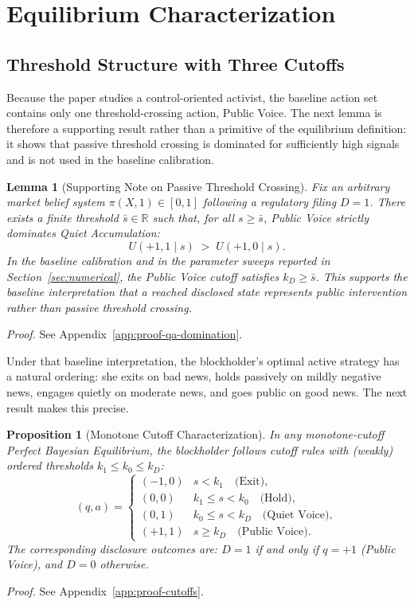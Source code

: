 \documentclass[11pt]{article}
\newtheorem{proposition}{Proposition}
\newtheorem{lemma}{Lemma}
\newcommand{\1}{\mathbf{1}}
\begin{document}
\section{Equilibrium Characterization}
\label{sec:equilibrium}

%
\subsection{Threshold Structure with Three Cutoffs}
%

Because the paper studies a control-oriented activist, the baseline action set contains only one threshold-crossing action, Public Voice. The next lemma is therefore a supporting result rather than a primitive of the equilibrium definition: it shows that passive threshold crossing is dominated for sufficiently high signals and is not used in the baseline calibration.

\begin{lemma}[Supporting Note on Passive Threshold Crossing]
\label{lem:qa-domination}
Fix an arbitrary market belief system $\pi(X,1)\in[0,1]$ following a regulatory filing $D=1$. There exists a finite threshold $\bar{s}\in\mathbb{R}$ such that, for all $s\ge \bar{s}$, Public Voice strictly dominates Quiet Accumulation:
\[
U(+1,1\mid s)\;>\;U(+1,0\mid s).
\]
In the baseline calibration and in the parameter sweeps reported in Section~\ref{sec:numerical}, the Public Voice cutoff satisfies $k_D\ge \bar{s}$. This supports the baseline interpretation that a reached disclosed state represents public intervention rather than passive threshold crossing.
\end{lemma}
\textit{Proof.} See Appendix~\ref{app:proof-qa-domination}.

Under that baseline interpretation, the blockholder's optimal active strategy has a natural ordering: she exits on bad news, holds passively on mildly negative news, engages quietly on moderate news, and goes public on good news. The next result makes this precise.

\begin{proposition}[Monotone Cutoff Characterization]
\label{prop:cutoffs}
In any monotone-cutoff Perfect Bayesian Equilibrium, the blockholder follows cutoff rules with (weakly) ordered thresholds $k_1 \leq k_0 \leq k_D$:
\[
(q, a) = \begin{cases}
(-1, 0) & s < k_1 \quad \text{(Exit)}, \\
(0, 0) & k_1 \leq s < k_0 \quad \text{(Hold)}, \\
(0, 1) & k_0 \leq s < k_D \quad \text{(Quiet Voice)}, \\
(+1, 1) & s \geq k_D \quad \text{(Public Voice)}.
\end{cases}
\]
The corresponding disclosure outcomes are: $D = 1$ if and only if $q = +1$ (Public Voice), and $D = 0$ otherwise.
\end{proposition}
\textit{Proof.} See Appendix~\ref{app:proof-cutoffs}.
\end{document}
